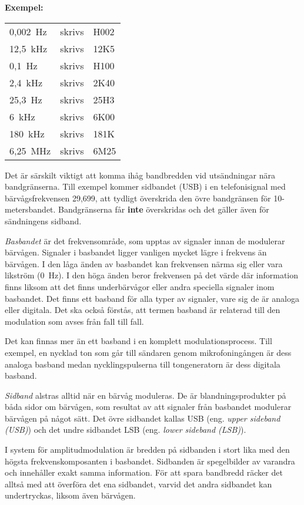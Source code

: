 \textbf{Exempel:}

\begin{tabular}{lll}
	0,002~Hz & skrivs & H002\\
	12,5~kHz & skrivs & 12K5\\
	0,1~Hz & skrivs & H100\\
	2,4~kHz & skrivs & 2K40\\
	25,3~Hz & skrivs & 25H3\\
	6~kHz & skrivs & 6K00\\
	180~kHz & skrivs & 181K\\
	6,25~MHz & skrivs & 6M25\\
\end{tabular}

Det är särskilt viktigt att komma ihåg bandbredden vid utsändningar nära
bandgränserna.
Till exempel kommer sidbandet (USB) i en telefonisignal med bärvågsfrekvensen 29,699,
att tydligt överskrida den övre bandgränsen för 10-metersbandet.
Bandgränserna får \textbf{inte} överskridas och det gäller även för sändningens
sidband.

\emph{Basbandet} är det frekvensområde, som upptas av signaler innan de
modulerar bärvågen.
Signaler i basbandet ligger vanligen mycket lägre i frekvens än bärvågen.
I den låga änden av basbandet kan frekvensen närma sig eller vara likström
(0~Hz).
I den höga änden beror frekvensen på det värde där information finns liksom att
det finns underbärvågor eller andra speciella signaler inom basbandet.
Det finns ett basband för alla typer av signaler, vare sig de är analoga eller
digitala.
Det ska också förstås, att termen basband är relaterad till den modulation som
avses från fall till fall.

Det kan finnas mer än ett basband i en komplett modulationsprocess.
Till exempel, en nycklad ton som går till sändaren genom mikrofoningången är
dess analoga basband medan nycklingspulserna till tongeneratorn är dess digitala
basband.

\emph{Sidband} alstras alltid när en bärvåg moduleras.
De är blandningsprodukter på båda sidor om bärvågen, som resultat av att
signaler från basbandet modulerar bärvågen på något sätt.
Det övre sidbandet kallas USB (eng. \emph{upper sideband (USB)})
och det undre sidbandet LSB (eng. \emph{lower sideband (LSB)}).

I system för amplitudmodulation är bredden på sidbanden i stort lika med den
högsta frekvenskomposanten i basbandet.
Sidbanden är spegelbilder av varandra och innehåller exakt samma information.
För att spara bandbredd räcker det alltså med att överföra det ena sidbandet,
varvid det andra sidbandet kan undertryckas, liksom även bärvågen.

